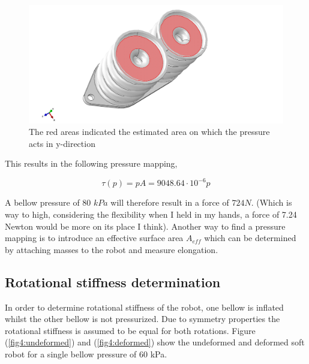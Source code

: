 \begin{figure}[H]
    \centering
    \includegraphics[width = \textwidth]{Figures/Chapter3/area.png}
    \caption{The red areas indicated the estimated area on which the pressure acts in y-direction}
    \label{fig4:bellowarea}
\end{figure}

This results in the following pressure mapping,

\begin{equation}
    \tau(p) = pA = 9048.64\cdot 10^{-6}p
\end{equation}

A bellow pressure of 80 $kPa$ will therefore result in a force of $724 N$. (Which is way to high, considering the flexibility when I held in my hands, a force of 7.24 Newton would be more on its place I think). Another way to find a pressure mapping is to introduce an effective surface area $A_{eff}$ which can be determined by attaching masses to the robot and measure elongation.



\subsection{Rotational stiffness determination}

In order to determine rotational stiffness of the robot, one bellow is inflated whilst the other bellow is not pressurized. Due to symmetry properties the rotational stiffness is assumed to be equal for both rotations. Figure (\ref{fig4:undeformed}) and (\ref{fig4:deformed}) show the undeformed and deformed soft robot for a single bellow pressure of 60 kPa. 



